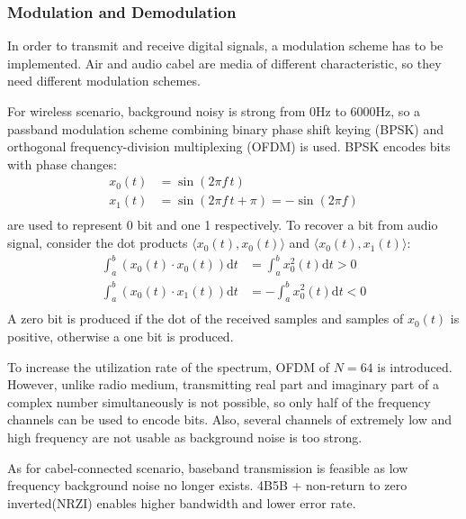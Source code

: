 \subsubsection{Modulation and Demodulation}
In order to transmit and receive digital signals, a modulation scheme has to be implemented.
Air and audio cabel are media of different characteristic, so they need different modulation schemes.\par
For wireless scenario, background noisy is strong from 0Hz to 6000Hz,
so a passband modulation scheme
combining binary phase shift keying (BPSK) and orthogonal frequency-division multiplexing (OFDM)
is used.
BPSK encodes bits with phase changes:
\begin{align*}
  x_0(t) & =\sin(2\pi f\, t)                       \\
  x_1(t) & =\sin(2\pi f\, t + \pi) = -\sin(2\pi f) \\
\end{align*}
are used to represent 0 bit and one 1 respectively.
To recover a bit from audio signal, consider the dot products $\langle x_0(t),x_0(t)\rangle$ and $\langle x_0(t),x_1(t) \rangle$:
\begin{align*}
  \int_a^b \left( x_0(t)\cdot x_0(t) \right) \mathrm{d}t & =  \int_a^b x_0^2(t) \mathrm{d}t > 0 \\
  \int_a^b \left( x_0(t)\cdot x_1(t) \right) \mathrm{d}t & = -\int_a^b x_0^2(t) \mathrm{d}t < 0 \\
\end{align*}
A zero bit is produced if the dot of the received samples and samples of $x_0(t)$ is positive, otherwise a one bit is produced.\par
To increase the utilization rate of the spectrum, OFDM of $N=64$ is introduced.
However, unlike radio medium, transmitting real part and imaginary part of a complex number simultaneously is not possible,
so only half of the frequency channels can be used to encode bits.
Also, several channels of extremely low and high frequency are not usable as background noise is too strong.\par
As for cabel-connected scenario, baseband transmission is feasible as low frequency background noise no longer exists.
4B5B + non-return to zero inverted(NRZI) enables higher bandwidth and lower error rate.

